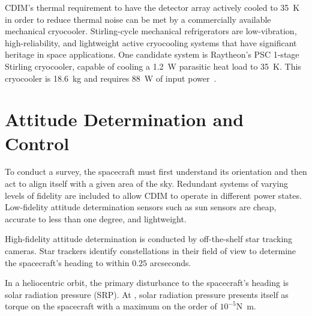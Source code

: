\documentclass{ws-jai}
\begin{document}
CDIM's thermal requirement to have the detector array actively cooled to \SI{35}{\kelvin} in order to reduce thermal noise can be met by a commercially available mechanical cryocooler.
Stirling-cycle mechanical refrigerators are low-vibration, high-reliability, and lightweight active cryocooling systems that have significant heritage in space applications.
One candidate system is Raytheon's PSC 1-stage Stirling cryocooler, capable of cooling a \SI{1.2}{\watt} parasitic heat load to \SI{35}{\kelvin}.
This cryocooler is \SI{18.6}{\kilo\gram} and requires \SI{88}{\watt} of input power~\cite{tchandbook2003}.




\section{Attitude Determination and Control}
\label{sec:adcs}
To conduct a survey, the spacecraft must first understand its orientation and then act to align itself with a given area of the sky.
Redundant systems of varying levels of fidelity are included to allow CDIM to operate in different power states.
Low-fidelity attitude determination sensors such as sun sensors are cheap, accurate to less than one degree, and lightweight.

High-fidelity attitude determination is conducted by off-the-shelf star tracking cameras.
Star trackers identify constellations in their field of view to determine the spacecraft's heading to within $0.25$ arcseconds.

In a heliocentric orbit, the primary disturbance to the spacecraft's heading is solar radiation pressure (SRP).
At \Ltwo, solar radiation pressure presents itself as torque on the spacecraft with a maximum on the order of $10^{-5}$\si{\newton\meter}.
\end{document}
